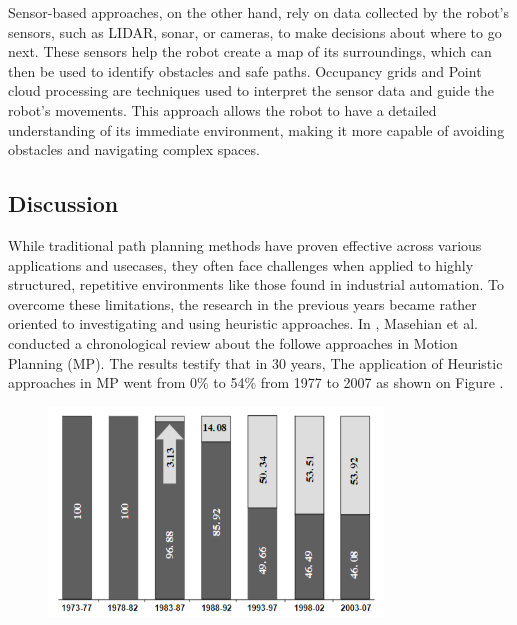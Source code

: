 Sensor-based approaches, on the other hand, rely on data collected by the robot's sensors, such as LIDAR, 
sonar, or cameras, to make decisions about where to go next. These sensors help the robot create a map of 
its surroundings, which can then be used to identify obstacles and safe paths. Occupancy grids and Point 
cloud processing are techniques used to interpret the sensor data and guide the 
robot's movements. This approach allows the robot to have a detailed understanding of its immediate 
environment, making it more capable of avoiding obstacles and navigating complex spaces.

\subsection{Discussion}

While traditional path planning methods have proven effective across various applications and usecases, 
they often face challenges when applied to highly structured, repetitive environments like those found 
in industrial automation. To overcome these limitations, the research in the previous years became rather 
oriented to investigating and using heuristic approaches. In \cite{R26}, Masehian et al. conducted a 
chronological review about the followe approaches in Motion Planning (MP). The results testify that in 30 years,
The application of Heuristic approaches in MP went from 0\% to 54\% from 1977 to 2007 as shown on Figure 
.

\begin{figure}[H]
    \centering  
    \includegraphics[width=3.5in]{images/Chap1/heuristic_barchart.png}\\ 
    \label{heuristic barchart} 
\end{figure}

